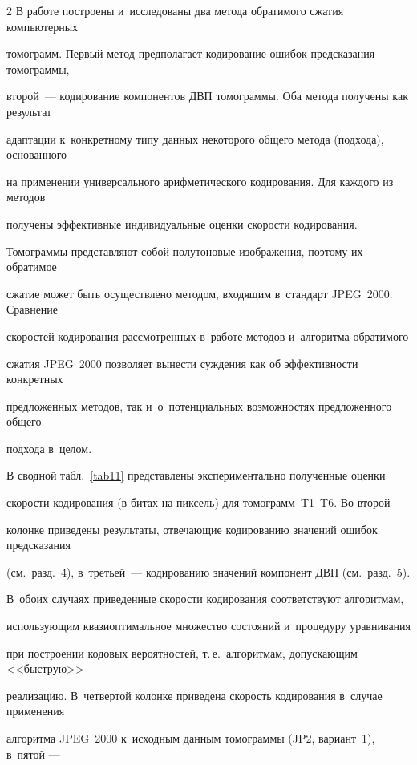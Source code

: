 \begin{multicols}{2}
В работе построены и~исследованы два метода обратимого сжатия компьютерных 

томограмм. Первый метод предполагает кодирование ошибок предсказания томограммы, 

второй~--- кодирование компонентов ДВП томограммы. Оба метода получены как результат 

адаптации к~конкретному типу данных некоторого общего метода (подхода), основанного 

на применении универсального арифметического кодирования. Для каждого из методов 

получены эффективные индивидуальные оценки скорости кодирования.



Томограммы представляют собой полутоновые изображения, поэтому их обратимое 

сжатие может быть осуществлено методом, входящим в~стандарт JPEG~2000. Сравнение 

скоростей кодирования рассмотрен\-ных в~работе методов и~алгоритма обратимого 

сжатия JPEG~2000 позволяет вынести суждения как об эффективности конкретных 

предложенных методов, так и~о~потенциальных возможностях предложенного общего 

подхода в~целом.



В сводной табл.~\ref{tab11} представлены экспериментально полученные оценки 

скорости кодирования (в битах на пиксель) для томограмм~T1--T6. Во второй 

колонке приведены результаты, отвеча\-ющие кодированию значений ошибок предсказания\linebreak 

(см.\ разд.~4), в~третьей~--- кодированию значений компонент ДВП (см.\ разд.~5). 

В~обоих случаях приведенные скорости кодирования соответствуют алгоритмам, 

использующим квазиоптимальное множество состояний и~процедуру уравнивания 

при построении кодовых вероятностей, т.\,е.\ алгоритмам, допускающим <<быструю>> 

реализацию. В~чет\-вер\-той колонке приведена скорость кодирования в~случае применения 

алгоритма JPEG~2000 к~исходным данным томограммы (JP2, вариант~1), в~пятой --- 


\end{multicols}
